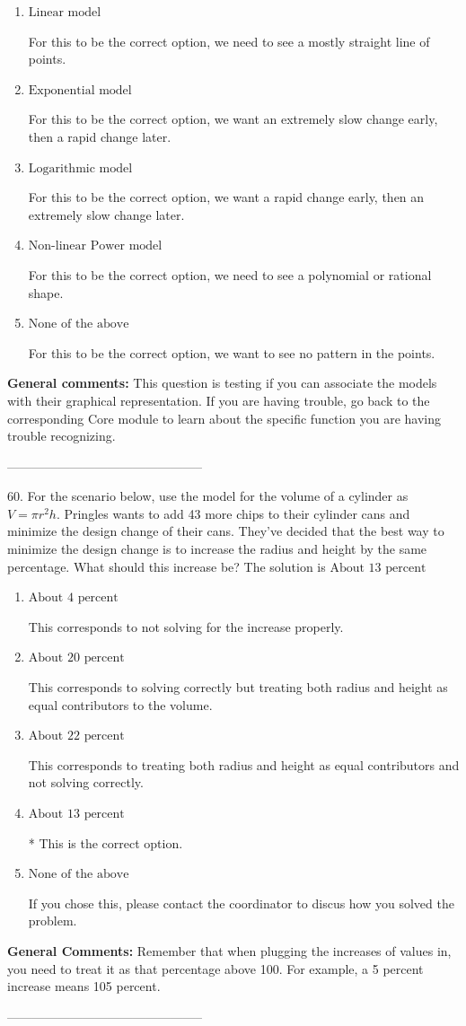\documentclass{extbook}[14pt]
\begin{document}
\begin{enumerate}[label=\Alph*.] 
\item $ \text{Linear model} $ 

 For this to be the correct option, we need to see a mostly straight line of points. 
\item $ \text{Exponential model} $ 

 For this to be the correct option, we want an extremely slow change early, then a rapid change later. 
\item $ \text{Logarithmic model} $ 

 For this to be the correct option, we want a rapid change early, then an extremely slow change later. 
\item $ \text{Non-linear Power model} $ 

 For this to be the correct option, we need to see a polynomial or rational shape. 
\item $ \text{None of the above} $ 

 For this to be the correct option, we want to see no pattern in the points. 
\end{enumerate} 
 
\textbf{General comments:} This question is testing if you can associate the models with their graphical representation. If you are having trouble, go back to the corresponding Core module to learn about the specific function you are having trouble recognizing.

-----------------------------------------------

60. For the scenario below, use the model for the volume of a cylinder as $V = \pi r^2 h$.
Pringles wants to add 43  more chips to their cylinder cans and minimize the design change of their cans. They've decided that the best way to minimize the design change is to increase the radius and height by the same percentage. What should this increase be? 
The solution is $ \text{About } 13 \text{ percent} $ 

\begin{enumerate}[label=\Alph*.] 
\item $ \text{About } 4 \text{ percent} $ 

 This corresponds to not solving for the increase properly. 
\item $ \text{About } 20 \text{ percent} $ 

 This corresponds to solving correctly but treating both radius and height as equal contributors to the volume. 
\item $ \text{About } 22 \text{ percent} $ 

 This corresponds to treating both radius and height as equal contributors and not solving correctly. 
\item $ \text{About } 13 \text{ percent} $ 

 * This is the correct option. 
\item $ \text{None of the above} $ 

 If you chose this, please contact the coordinator to discus how you solved the problem. 
\end{enumerate} 
 
\textbf{General Comments:} Remember that when plugging the increases of values in, you need to treat it as that percentage above 100. For example, a 5 percent increase means 105 percent.

-----------------------------------------------
\end{document}
